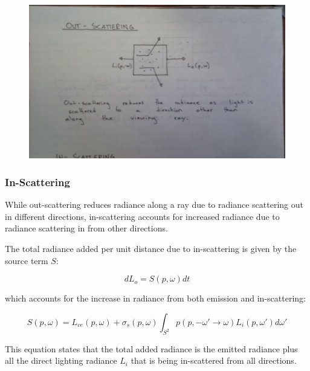 \documentclass{article}
\begin{document}
\begin{figure}[h!]
	\centering
	\includegraphics[scale=0.5]{Images/OutScattering}
\end{figure}

\subsubsection{In-Scattering}

While out-scattering reduces radiance along a ray due to radiance scattering out in different directions, in-scattering accounts for increased radiance due to radiance scattering in from other directions.

The total radiance added per unit distance due to in-scattering is given by the source term $S$:

\begin{equation}
dL_{o} = S(p,\omega)dt
\end{equation}

which accounts for the increase in radiance from both emission and in-scattering:

\begin{equation}
S(p,\omega) = L_{ve}(p,\omega) + \sigma_{s}(p,\omega)\int_{S^{2}}p(p,-\omega'\rightarrow\omega)L_{i}(p,\omega')d\omega'
\end{equation}

This equation states that the total added radiance is the emitted radiance plus all the direct lighting radiance $L_{i}$ that is being in-scattered from all directions.
\end{document}
